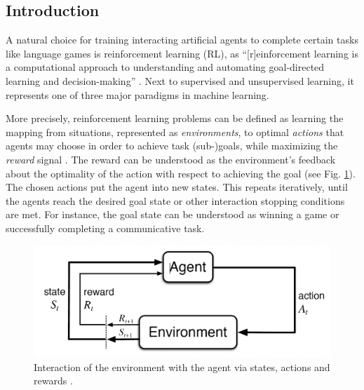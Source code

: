 \subsection{Introduction}
A natural choice for training interacting artificial agents to complete certain tasks like language games is reinforcement learning (RL), as ``[r]einforcement learning is a computational approach to understanding and automating goal-directed learning and decision-making'' \parencite[][p.~15]{sutton2018reinforcement}. Next to supervised and unsupervised learning, it represents one of three major paradigms in machine learning. 

More precisely, reinforcement learning problems can be defined as learning the mapping from situations, represented as \textit{environments}, to optimal \textit{actions} that agents may choose in order to achieve task (sub-)goals, while maximizing the \textit{reward} signal \parencite{sutton2018reinforcement}. The reward can be understood as the environment's feedback about the optimality of the action with respect to achieving the goal (see Fig. \ref{fig:rl}). The chosen actions put the agent into new states. This repeats iteratively, until the agents reach the desired goal state or other interaction stopping conditions are met. For instance, the goal state can be understood as winning a game or successfully completing a communicative task. 

\begin{figure}
	\centering
	\includegraphics[width=0.8\linewidth]{images/rl_intro.png}
	\caption{Interaction of the environment with the agent via states, actions and rewards \parencite[][p. 48]{sutton2018reinforcement}.}
	\label{fig:rl}
\end{figure}

